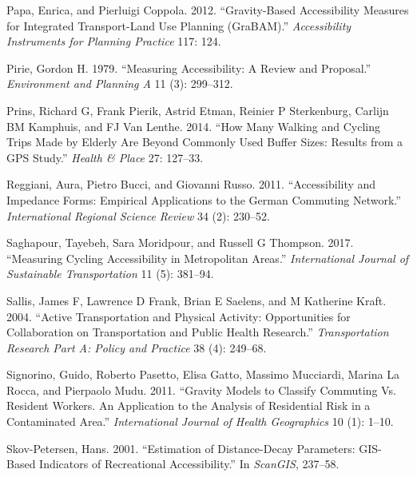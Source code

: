 \documentclass[preprint, 3p,
authoryear]{elsarticle} %
\newlength{\cslhangindent}
\newlength{\cslentryspacingunit} %
\newenvironment{CSLReferences}[2] %
 {%
  \setlength{\parindent}{0pt}
  \ifodd #1
  \let\oldpar\par
  \def\par{\hangindent=\cslhangindent\oldpar}
  \fi
  \setlength{\parskip}{#2\cslentryspacingunit}
 }%
 {}
\begin{document}
\begin{CSLReferences}{1}{0}
\leavevmode{}%
Papa, Enrica, and Pierluigi Coppola. 2012. {``Gravity-Based
Accessibility Measures for Integrated Transport-Land Use Planning
(GraBAM).''} \emph{Accessibility Instruments for Planning Practice} 117:
124.

\leavevmode{}%
Pirie, Gordon H. 1979. {``Measuring Accessibility: A Review and
Proposal.''} \emph{Environment and Planning A} 11 (3): 299--312.

\leavevmode{}%
Prins, Richard G, Frank Pierik, Astrid Etman, Reinier P Sterkenburg,
Carlijn BM Kamphuis, and FJ Van Lenthe. 2014. {``How Many Walking and
Cycling Trips Made by Elderly Are Beyond Commonly Used Buffer Sizes:
Results from a GPS Study.''} \emph{Health \& Place} 27: 127--33.

\leavevmode{}%
Reggiani, Aura, Pietro Bucci, and Giovanni Russo. 2011. {``Accessibility
and Impedance Forms: Empirical Applications to the German Commuting
Network.''} \emph{International Regional Science Review} 34 (2):
230--52.

\leavevmode{}%
Saghapour, Tayebeh, Sara Moridpour, and Russell G Thompson. 2017.
{``Measuring Cycling Accessibility in Metropolitan Areas.''}
\emph{International Journal of Sustainable Transportation} 11 (5):
381--94.

\leavevmode{}%
Sallis, James F, Lawrence D Frank, Brian E Saelens, and M Katherine
Kraft. 2004. {``Active Transportation and Physical Activity:
Opportunities for Collaboration on Transportation and Public Health
Research.''} \emph{Transportation Research Part A: Policy and Practice}
38 (4): 249--68.

\leavevmode{}%
Signorino, Guido, Roberto Pasetto, Elisa Gatto, Massimo Mucciardi,
Marina La Rocca, and Pierpaolo Mudu. 2011. {``Gravity Models to Classify
Commuting Vs. Resident Workers. An Application to the Analysis of
Residential Risk in a Contaminated Area.''} \emph{International Journal
of Health Geographics} 10 (1): 1--10.

\leavevmode{}%
Skov-Petersen, Hans. 2001. {``Estimation of Distance-Decay Parameters:
GIS-Based Indicators of Recreational Accessibility.''} In
\emph{ScanGIS}, 237--58.


\end{CSLReferences}
\end{document}
